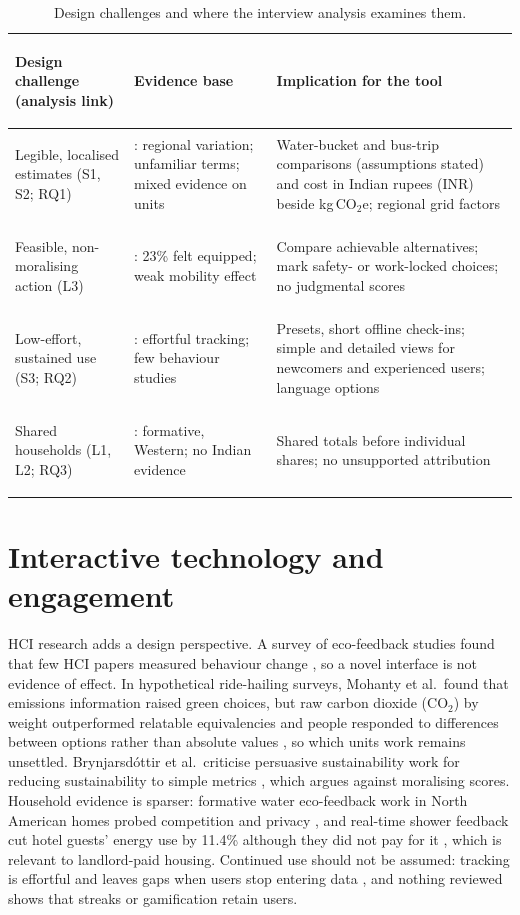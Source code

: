 \documentclass[12pt,a4paper,twocolumn]{article}
\begin{document}
\begin{table}[t]
\centering
\footnotesize
\setlength{\tabcolsep}{4pt}
\caption{Design challenges and where the interview analysis examines them.}
\label{tab:challenges}
\begin{tabularx}{\textwidth}{>{\bfseries\raggedright\arraybackslash}p{4.7cm} p{4.5cm} X}
\toprule
\textbf{Design challenge (analysis link)} & \textbf{Evidence base} & \textbf{Implication for the tool}\\
\midrule
Legible, localised estimates (S1, S2; RQ1) & \cite{lee2021,gandhi2025,grinstein2018,mohanty2023,shi2021}: regional variation; unfamiliar terms; mixed evidence on units & Water-bucket and bus-trip comparisons (assumptions stated) and cost in Indian rupees (INR) beside kg\,CO$_2$e; regional grid factors\\
Feasible, non-moralising action (L3) & \cite{collins2020,hoffmann2024,brynjarsdottir2012}: 23\% felt equipped; weak mobility effect & Compare achievable alternatives; mark safety- or work-locked choices; no judgmental scores\\
Low-effort, sustained use (S3; RQ2) & \cite{hoffmann2024,froehlich2010}: effortful tracking; few behaviour studies & Presets, short offline check-ins; simple and detailed views for newcomers and experienced users; language options\\
Shared households (L1, L2; RQ3) & \cite{froehlich2012,tiefenbeck2019}: formative, Western; no Indian evidence & Shared totals before individual shares; no unsupported attribution\\
\bottomrule
\end{tabularx}
\end{table}

\section{Interactive technology and engagement}
HCI research adds a design perspective. A survey of eco-feedback studies found that few HCI papers measured behaviour change \cite{froehlich2010}, so a novel interface is not evidence of effect. In hypothetical ride-hailing surveys, Mohanty et al.\ found that emissions information raised green choices, but raw carbon dioxide (CO$_2$) by weight outperformed relatable equivalencies and people responded to differences between options rather than absolute values \cite{mohanty2023}, so which units work remains unsettled. Brynjarsd\'ottir et al.\ criticise persuasive sustainability work for reducing sustainability to simple metrics \cite{brynjarsdottir2012}, which argues against moralising scores. Household evidence is sparser: formative water eco-feedback work in North American homes probed competition and privacy \cite{froehlich2012}, and real-time shower feedback cut hotel guests' energy use by 11.4\% although they did not pay for it \cite{tiefenbeck2019}, which is relevant to landlord-paid housing. Continued use should not be assumed: tracking is effortful and leaves gaps when users stop entering data \cite{hoffmann2024}, and nothing reviewed shows that streaks or gamification retain users.
\end{document}
